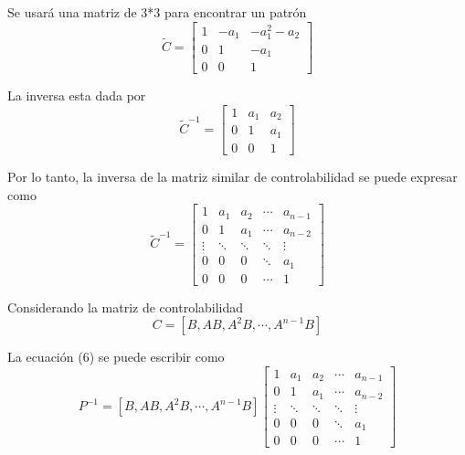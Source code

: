 Se usará una matriz de 3*3 para encontrar un patrón
\[
    \tilde{C} = 
    \begin{bmatrix}
        1 & -a_{1} & -a_{1}^{2}-a_{2} \\
        0 & 1 & -a_{1} \\
        0 & 0 & 1
    \end{bmatrix}
\]

La inversa esta dada por
\[
    \tilde{C}^{-1} = 
    \begin{bmatrix}
        1 & a_{1} & a_{2} \\
        0 & 1 & a_{1} \\
        0 & 0 & 1
    \end{bmatrix}
\]

Por lo tanto, la inversa de la matriz similar de controlabilidad se puede expresar como 
\[
    \tilde{C}^{-1} = 
    \begin{bmatrix}
        1 & a_{1} & a_{2} & \cdots & a_{n-1} \\
        0 & 1 & a_{1} & \cdots & a_{n-2} \\
        \vdots & \ddots & \ddots & \ddots & \vdots \\
        0 & 0 & 0 & \ddots & a_{1} \\
        0 & 0 & 0 & \cdots & 1
    \end{bmatrix}
\]

Considerando la matriz de controlabilidad 
\[
    C = [B, AB, A^{2}B, \cdots, A^{n-1}B ]
\]

La ecuación (6) se puede escribir como
\[
    P^{-1} =
    [B, AB, A^{2}B, \cdots, A^{n-1}B ]
    \begin{bmatrix}
        1 & a_{1} & a_{2} & \cdots & a_{n-1} \\
        0 & 1 & a_{1} & \cdots & a_{n-2} \\
        \vdots & \ddots & \ddots & \ddots & \vdots \\
        0 & 0 & 0 & \ddots & a_{1} \\
        0 & 0 & 0 & \cdots & 1
    \end{bmatrix}
\]